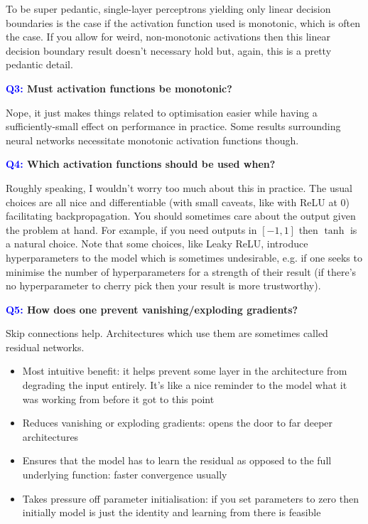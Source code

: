 \documentclass[11pt]{article}
\begin{document}
To be super pedantic, single-layer perceptrons yielding only linear decision boundaries is the case if the activation function used is monotonic, which is often the case. If you allow for weird, non-monotonic activations then this linear decision boundary result doesn't necessary hold but, again, this is a pretty pedantic detail.

\begin{center}
    \textbf{\textcolor{blue}{Q3:} Must activation functions be monotonic?}
\end{center}
Nope, it just makes things related to optimisation easier while having a sufficiently-small effect on performance in practice. Some results surrounding neural networks necessitate monotonic activation functions though.

\begin{center}
    \textbf{\textcolor{blue}{Q4:} Which activation functions should be used when?}
\end{center}
Roughly speaking, I wouldn't worry too much about this in practice. The usual choices are all nice and differentiable (with small caveats, like with ReLU at 0) facilitating backpropagation. You should sometimes care about the output given the problem at hand. For example, if you need outputs in $[-1,1]$ then $\tanh$ is a natural choice. Note that some choices, like Leaky ReLU, introduce hyperparameters to the model which is sometimes undesirable, e.g. if one seeks to minimise the number of hyperparameters for a strength of their result (if there's no hyperparameter to cherry pick then your result is more trustworthy).

\begin{center}
    \textbf{\textcolor{blue}{Q5:} How does one prevent vanishing/exploding gradients?}
\end{center}

\noindent Skip connections help. Architectures which use them are sometimes called residual networks.
\begin{itemize}
    \item Most intuitive benefit: it helps prevent some layer in the architecture from degrading the input entirely. It's like a nice reminder to the model what it was working from before it got to this point
    \item Reduces vanishing or exploding gradients: opens the door to far deeper architectures
    \item Ensures that the model has to learn the residual as opposed to the full underlying function: faster convergence usually
    \item Takes pressure off parameter initialisation: if you set parameters to zero then initially model is just the identity and learning from there is feasible
\end{itemize}
\end{document}
